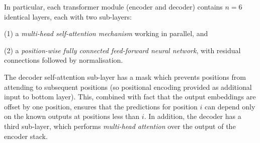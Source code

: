 \documentclass{article}
\begin{document}
	In particular, each transformer module (encoder and decoder) contains $n=6$ identical layers, each 
	with two sub-layers:
		\begin{enumerate*}
			\item[(1)] a \textit{multi-head self-attention mechanism} working in parallel, and 
			\item[(2)] a \textit{position-wise fully connected feed-forward neural network}, with residual 
			connections followed by normalisation.
	\end{enumerate*}
	The decoder self-attention sub-layer has a mask which prevents positions from attending to 
	subsequent positions (so positional encoding provided as additional input to bottom layer). This, 
	combined with fact that the output embeddings are offset by one position, ensures that the 
	predictions for position $i$ can depend only on the known outputs at positions less than $i$.
 	In addition, the decoder has a third sub-layer, which performs \textit{multi-head attention} over the 
 	output of the encoder stack. 
  
	
%	
	
\end{document}
